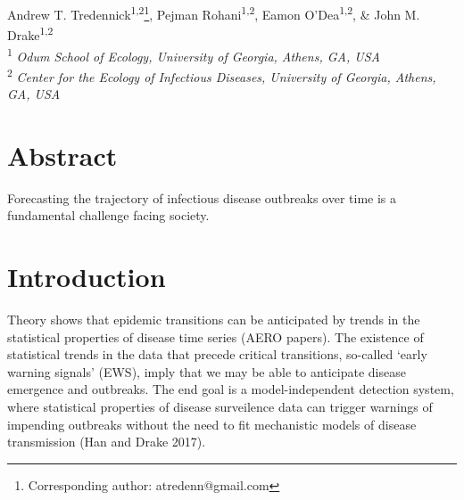 \documentclass[11pt,]{article}
\title{}
\author{}
\date{}
\let\rmarkdownfootnote\footnote%
\def\footnote{\protect\rmarkdownfootnote}
\begin{document}
\raggedright\vspace*{0.2in}

\begin{centering}

{\Large
\textbf{} 
}

\vspace{2em}

Andrew T. Tredennick\textsuperscript{1,2}\footnote{Corresponding author: atredenn@gmail.com},
Pejman Rohani\textsuperscript{1,2},
Eamon O'Dea\textsuperscript{1,2},
\& John M. Drake\textsuperscript{1,2}
\\
\bigskip
\textsuperscript{1} \small\emph{Odum School of Ecology, University of Georgia, Athens, GA, USA} \\
\textsuperscript{2} \small\emph{Center for the Ecology of Infectious Diseases, University of Georgia, Athens, GA, USA}

\end{centering}

\hypertarget{abstract}{%
\section{Abstract}\label{abstract}}

Forecasting the trajectory of infectious disease outbreaks over time is
a fundamental challenge facing society.

\linenumbers

\hypertarget{introduction}{%
\section{Introduction}\label{introduction}}

Theory shows that epidemic transitions can be anticipated by trends in
the statistical properties of disease time series (AERO papers). The
existence of statistical trends in the data that precede critical
transitions, so-called `early warning signals' (EWS), imply that we may
be able to anticipate disease emergence and outbreaks. The end goal is a
model-independent detection system, where statistical properties of
disease surveilence data can trigger warnings of impending outbreaks
without the need to fit mechanistic models of disease transmission (Han
and Drake 2017).
\end{document}
